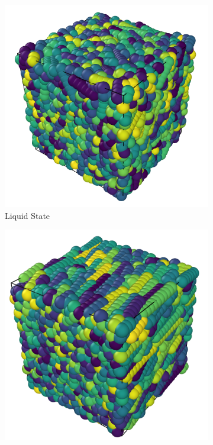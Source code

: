 \documentclass[11pt, a4paper]{article} %
\begin{document}
\begin{figure}[ht]
	\begin{subfigure}{.45\textwidth}
		\centering
		\includegraphics[width=\linewidth]{Figures/longrun_phasetrans2}  
		\caption{Liquid State}
		\label{fig:cubic_liquid}
	\end{subfigure}
	\hfill %
	\begin{subfigure}{.42\textwidth}
		\centering
		\includegraphics[width=\linewidth]{Figures/longrun_phasetrans3}  

\end{subfigure}
\end{figure}
\end{document}
